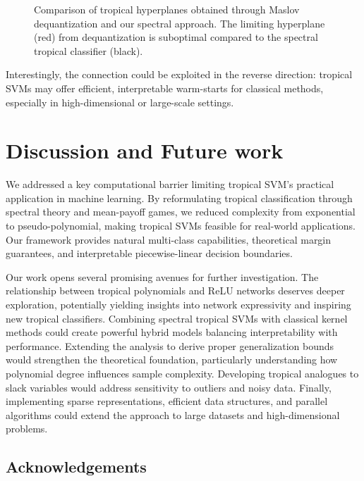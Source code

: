 \documentclass{article}
\begin{document}
\begin{figure}[h]
    \centering
    \resizebox{0.5\textwidth}{!}{\clipbox{0.15\width{} 0.15\height{} 0.15\width{} 0.15\height{}}{}}
    \caption{Comparison of tropical hyperplanes obtained through Maslov dequantization and our spectral approach. The limiting hyperplane (red) from dequantization is suboptimal compared to the spectral tropical classifier (black).}
    \label{fig:maslov_dequantization}
\end{figure}

Interestingly, the connection could be exploited in the reverse direction: tropical SVMs may offer efficient, interpretable warm-starts for classical methods, especially in high-dimensional or large-scale settings.

\section{Discussion and Future work}\label{sec:discussion}

We addressed a key computational barrier limiting tropical SVM's practical application in machine learning. By reformulating tropical classification through spectral theory and mean-payoff games, we reduced complexity from exponential to pseudo-polynomial, making tropical SVMs feasible for real-world applications. Our framework provides natural multi-class capabilities, theoretical margin guarantees, and interpretable piecewise-linear decision boundaries.

Our work opens several promising avenues for further investigation. The relationship between tropical polynomials and ReLU networks deserves deeper exploration, potentially yielding insights into network expressivity and inspiring new tropical classifiers. Combining spectral tropical SVMs with classical kernel methods could create powerful hybrid models balancing interpretability with performance. Extending the analysis to derive proper generalization bounds would strengthen the theoretical foundation, particularly understanding how polynomial degree influences sample complexity. Developing tropical analogues to slack variables would address sensitivity to outliers and noisy data. Finally, implementing sparse representations, efficient data structures, and parallel algorithms could extend the approach to large datasets and high-dimensional problems.

\subsection*{Acknowledgements}
\end{document}
